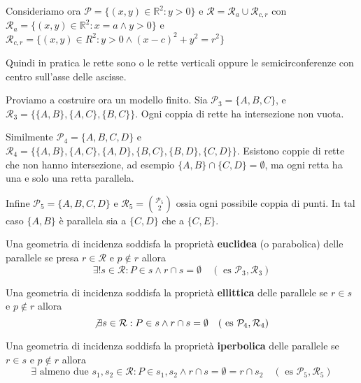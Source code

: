 \begin{example}
    Consideriamo ora \(\mathcal{P} = \{{(x,y)} \in \mathbb{R}^2 : y > 0\} \) e
    \(\mathcal{R} = \mathcal{R}_a \cup \mathcal{R}_{c, r} \) con \(\mathcal{R}_a
    = \{{(x,y)} \in \mathbb{R}^2 : x = a \land y > 0\} \) e \(\mathcal{R}_{c, r}
    = \{{(x,y)} \in R^2 : y > 0 \land {(x-c)}^2 + y^2 = r^2\} \) 

    Quindi in pratica le rette sono o le rette verticali oppure le
    semicirconferenze con centro sull'asse delle ascisse.
\end{example}

\begin{example}
Proviamo a costruire ora un modello finito. Sia \(\mathcal{P}_3 = \{A, B, C\} \),
e \(\mathcal{R}_3 = \{\{A, B\} , \{A, C\} , \{B, C\} \} \). 
Ogni coppia di rette ha intersezione non vuota.

Similmente \(\mathcal{P}_4 = \{A, B, C, D\} \) e \\ \(\mathcal{R}_4 = \{\{A, B\} ,
\{A, C\} , \{A, D\} , \{B, C\} , \{B, D\} , \{C, D\} \} \). 
Esistono coppie di rette che non hanno intersezione, ad esempio \(\{A, B\} \cap
\{C, D\} = \emptyset\), ma ogni retta ha una e solo una retta parallela.

Infine \(\mathcal{P}_5 = \{A, B, C, D\} \) e \(\mathcal{R}_5 =
\binom{\mathcal{P}_5}{2} \) ossia ogni possibile coppia di punti. In tal caso
\(\{A, B\}\) è parallela sia a \(\{C, D\} \) che a \(\{C, E\} \).
\end{example}

Una geometria di incidenza soddisfa la proprietà \textbf{euclidea} (o
parabolica) delle parallele se
presa \(r \in \mathcal{R}\) e \(p \not\in r\) allora 
\[
  \exists  ! s \in \mathcal{R} : P \in s \land r \cap s = \emptyset \quad
  (\text{ es  } \mathcal{P}_3, \mathcal{R}_3)
\]

Una geometria di incidenza soddisfa la proprietà \textbf{ellittica} delle
parallele se \(r \in s\) e \(p \not\in  r\) allora
\[
  \not \exists s \in \mathcal{R} : P \in s \land r \cap s = \emptyset \quad
    (\text{ es  } \mathcal{P}_4, \mathcal{R}_4)
\]

Una geometria di incidenza soddisfa la proprietà \textbf{iperbolica} delle
parallele se \(r \in s\) e \(p \not\in  r\) allora
\[
  \exists \text{ almeno due } s_{1}, s_{2} \in \mathcal{R} : P \in s_{1}, s_{2}
  \land r \cap s = \emptyset = r \cap s_{2} \quad (\text{ es  }\mathcal{P}_5, 
    \mathcal{R}_5)
\]

